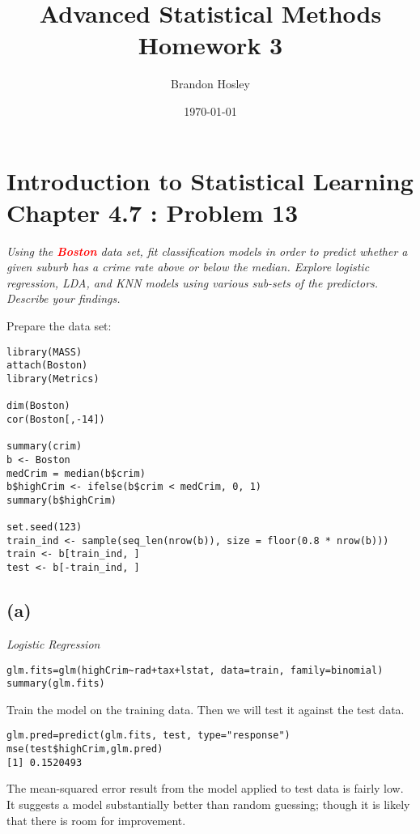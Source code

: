 \documentclass[a4paper,man,natbib]{apa6}
\title{Advanced Statistical Methods Homework 3}
\author{Brandon Hosley}
\date{\today}
\affiliation{University of Illinois - Springfield}
\begin{document}
\maketitle
\singlespacing

\section{Introduction to Statistical Learning \\ Chapter 4.7 : Problem 13}
\emph{
Using the \textbf{\textcolor{red}{Boston}} data set, 
fit classification models in order to predict
whether a given suburb has a crime rate above or below the median.
Explore logistic regression, LDA, and KNN models using various sub-sets of the predictors. Describe your findings.}

Prepare the data set:

\begin{verbatim}
library(MASS)
attach(Boston)
library(Metrics)

dim(Boston)
cor(Boston[,-14])

summary(crim)
b <- Boston
medCrim = median(b$crim)
b$highCrim <- ifelse(b$crim < medCrim, 0, 1)
summary(b$highCrim)

set.seed(123)
train_ind <- sample(seq_len(nrow(b)), size = floor(0.8 * nrow(b)))
train <- b[train_ind, ]
test <- b[-train_ind, ]
\end{verbatim}

\subsection{(a)} 
\emph{Logistic Regression}
\begin{verbatim}
glm.fits=glm(highCrim~rad+tax+lstat, data=train, family=binomial)
summary(glm.fits)
\end{verbatim}

Train the model on the training data. Then we will test it against the test data.

\begin{verbatim}
glm.pred=predict(glm.fits, test, type="response")
mse(test$highCrim,glm.pred)
[1] 0.1520493
\end{verbatim}

The mean-squared error result from the model applied to test data is fairly low. It suggests a model substantially better than random guessing; though it is likely that there is room for improvement.
\end{document}
